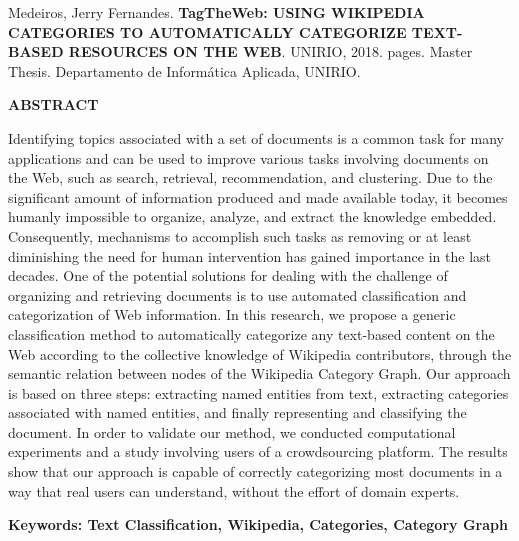 Medeiros, Jerry Fernandes. \textbf{TagTheWeb: USING WIKIPEDIA CATEGORIES TO AUTOMATICALLY CATEGORIZE TEXT-BASED RESOURCES ON THE WEB}. UNIRIO, 2018. \pageref{LastPage} pages. Master Thesis. Departamento de Informática Aplicada, UNIRIO.
\vspace{30pt}
\begin{center}
    \textbf{ABSTRACT}
    \vspace{30pt}
\end{center}
Identifying topics associated with a set of documents is a common task for many applications and can be used to improve various tasks involving documents on the Web, such as search, retrieval, recommendation, and clustering. Due to the significant amount of information produced and made available today, it becomes humanly impossible to organize, analyze, and extract the knowledge embedded. Consequently, mechanisms to accomplish such tasks as removing or at least diminishing the need for human intervention has gained importance in the last decades. One of the potential solutions for dealing with the challenge of organizing and retrieving documents is to use automated classification and categorization of Web information. In this research, we propose a generic classification method to automatically categorize any text-based content on the Web according to the collective knowledge of Wikipedia contributors, through the semantic relation between nodes of the Wikipedia Category Graph. Our approach is based on three steps: extracting named entities from text, extracting categories associated with named entities, and finally representing and classifying the document. In order to validate our method, we conducted computational experiments and a study involving users of a crowdsourcing platform. The results show that our approach is capable of correctly categorizing most documents in a way that real users can understand, without the effort of domain experts.

\vspace{15pt}

\textbf{Keywords: Text Classification, Wikipedia, Categories, Category Graph}

